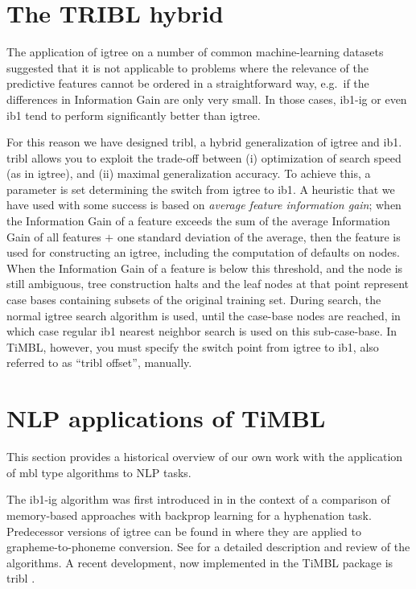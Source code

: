 \documentclass{report}
\begin{document}
\section{The TRIBL hybrid}
\label{tribl}

The application of {\sc igtree} on a number of common machine-learning
datasets suggested that it is not applicable to problems where the
relevance of the predictive features cannot be ordered in a
straightforward way, e.g.~if the differences in Information Gain are
only very small. In those cases, {\sc ib1-ig} or even {\sc ib1} tend
to perform significantly better than {\sc igtree}.

For this reason we have designed {\sc tribl}, a hybrid generalization
of {\sc igtree} and {\sc ib1}. {\sc tribl} allows you to exploit the
trade-off between (i) optimization of search speed (as in {\sc
igtree}), and (ii) maximal generalization accuracy. To achieve this, a
parameter is set determining the switch from {\sc igtree} to {\sc
ib1}. A heuristic that we have used with some success is based on {\em
average feature information gain}; when the Information Gain of a
feature exceeds the sum of the average Information Gain of all
features $+$ one standard deviation of the average, then the feature
is used for constructing an {\sc igtree}, including the computation of
defaults on nodes. When the Information Gain of a feature is below
this threshold, and the node is still ambiguous, tree construction
halts and the leaf nodes at that point represent case bases containing
subsets of the original training set. During search, the normal {\sc
igtree} search algorithm is used, until the case-base nodes are
reached, in which case regular {\sc ib1} nearest neighbor search is
used on this sub-case-base. In TiMBL, however, you must specify the
switch point from {\sc igtree} to {\sc ib1}, also referred to as
``{\sc tribl} offset'', manually.

\section{NLP applications of TiMBL}
\label{furtherreading}

This section provides a historical overview of our own work with the
application of {\sc mbl} type algorithms to NLP tasks.

 The {\sc ib1-ig} algorithm was first introduced in
\cite{Daelemans+92b} in the context of a comparison of memory-based
approaches with backprop learning for a hyphenation task.  Predecessor
versions of {\sc igtree} can be found in
\cite{Daelemans+93c,VandenBosch+93} where they are applied to
grapheme-to-phoneme conversion.  See \cite{Daelemans+97} for a
detailed description and review of the algorithms.  A recent
development, now implemented in the TiMBL package is {\sc tribl}
\cite{Daelemans+97d}.
\end{document}
